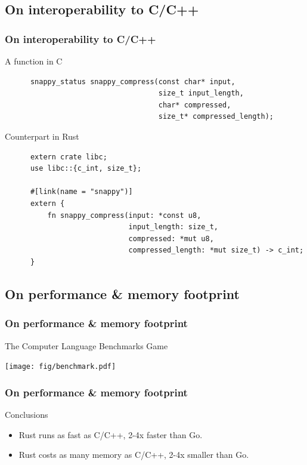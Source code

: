 \documentclass[lualatex,utf8]{beamer}
\begin{document}
\subsection{On interoperability to C/C++}

\begin{frame}[fragile]
  \frametitle{On interoperability to C/C++}
  \begin{exampleblock}{A function in C}
    \begin{verbatim}
      snappy_status snappy_compress(const char* input,
                                    size_t input_length,
                                    char* compressed,
                                    size_t* compressed_length);
    \end{verbatim}
  \end{exampleblock}
  \begin{block}{Counterpart in Rust}
    \begin{verbatim}
      extern crate libc;
      use libc::{c_int, size_t};

      #[link(name = "snappy")]
      extern {
          fn snappy_compress(input: *const u8,
                             input_length: size_t,
                             compressed: *mut u8,
                             compressed_length: *mut size_t) -> c_int;
      }
    \end{verbatim}
  \end{block}
\end{frame}

\subsection{On performance \& memory footprint}

\begin{frame}
  \frametitle{On performance \& memory footprint}
  \begin{block}{The Computer Language Benchmarks Game}
    \begin{center}
      \texttt{[image: fig/benchmark.pdf]}
    \end{center}
  \end{block}
\end{frame}

\begin{frame}
  \frametitle{On performance \& memory footprint}
  \begin{block}{Conclusions}
    \begin{itemize}
    \item Rust runs as fast as C/C++, 2-4x faster than Go.
    \item Rust costs as many memory as C/C++, 2-4x smaller than Go.
    \end{itemize}
  \end{block}
\end{frame}
\end{document}
